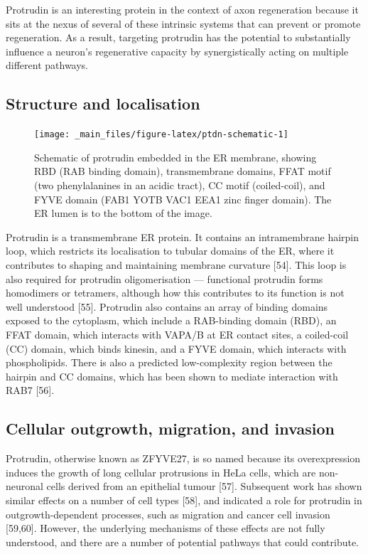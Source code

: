 \documentclass[
  12pt,
  a4paper,
]{book}
\begin{document}
Protrudin is an interesting protein in the context of axon regeneration because it sits at the nexus of several of these intrinsic systems that can prevent or promote regeneration. As a result, targeting protrudin has the potential to substantially influence a neuron's regenerative capacity by synergistically acting on multiple different pathways.

\subsection{Structure and localisation}\label{structure-and-localisation}

\begin{figure}
\texttt{[image: \_main\_files/figure-latex/ptdn-schematic-1]} \caption[Protrudin schematic]{Schematic of protrudin embedded in the ER membrane, showing RBD (RAB binding domain), transmembrane domains, FFAT motif (two phenylalanines in an acidic tract), CC motif (coiled-coil), and FYVE domain (FAB1 YOTB VAC1 EEA1 zinc finger domain).  The ER lumen is to the bottom of the image.}\label{fig:ptdn-schematic}
\end{figure}

Protrudin is a transmembrane ER protein. It contains an intramembrane hairpin loop, which restricts its localisation to tubular domains of the ER, where it contributes to shaping and maintaining membrane curvature {[}54{]}. This loop is also required for protrudin oligomerisation --- functional protrudin forms homodimers or tetramers, although how this contributes to its function is not well understood {[}55{]}. Protrudin also contains an array of binding domains exposed to the cytoplasm, which include a RAB-binding domain (RBD), an FFAT domain, which interacts with VAPA/B at ER contact sites, a coiled-coil (CC) domain, which binds kinesin, and a FYVE domain, which interacts with phospholipids. There is also a predicted low-complexity region between the hairpin and CC domains, which has been shown to mediate interaction with RAB7 {[}56{]}.

\subsection{Cellular outgrowth, migration, and invasion}\label{cellular-outgrowth-migration-and-invasion}

Protrudin, otherwise known as ZFYVE27, is so named because its overexpression induces the growth of long cellular protrusions in HeLa cells, which are non-neuronal cells derived from an epithelial tumour {[}57{]}. Subsequent work has shown similar effects on a number of cell types {[}58{]}, and indicated a role for protrudin in outgrowth-dependent processes, such as migration and cancer cell invasion {[}59,60{]}. However, the underlying mechanisms of these effects are not fully understood, and there are a number of potential pathways that could contribute.
\end{document}
